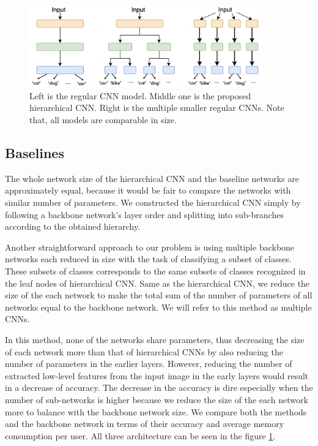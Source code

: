 \begin{figure}
    \centering
    \includegraphics[width=0.9\textwidth]{thesis/images/classification_baselines-fig.png}
    \caption{Left is the regular CNN model. Middle one is the proposed hierarchical CNN. Right is the multiple smaller regular CNNs. Note that, all models are comparable in size.}
    \label{fig:baselines}
\end{figure}

\subsection{Baselines}
\label{ssec:baselines}
The whole network size of the hierarchical CNN and the baseline networks are approximately equal, because it would be fair to compare the networks with similar number of parameters. 
We constructed the hierarchical CNN simply by following a backbone network's layer order and splitting into sub-branches according to the obtained hierarchy. 

Another straightforward approach to our problem is using multiple backbone networks each reduced in size with the task of classifying a subset of classes. 
These subsets of classes corresponds to the same subsets of classes recognized in the leaf nodes of hierarchical CNN.
Same as the hierarchical CNN, we reduce the size of the each network to make the total sum of the number of parameters of all networks equal to the backbone network. 
We will refer to this method as multiple CNNs. 

In this method, none of the networks share parameters, thus decreasing the size of each network more than that of hierarchical CNNs by also reducing the number of parameters in the earlier layers. 
However, reducing the number of extracted low-level features from the input image in the early layers would result in a decrease of accuracy. 
The decrease in the accuracy is dire especially when the number of sub-networks is higher because we reduce the size of the each network more to balance with the backbone network size. 
We compare both the methods and the backbone network in terms of their accuracy and average memory consumption per user. 
All three architecture can be seen in the figure \ref{fig:baselines}.

